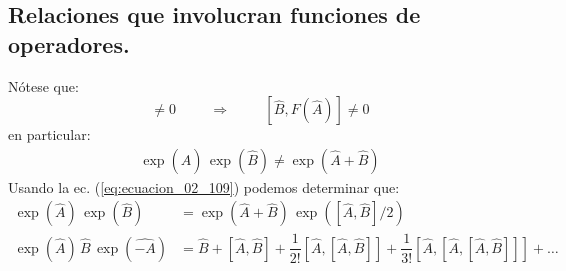 \subsection*{Relaciones que involucran funciones de operadores.}

Nótese que:
\begin{equation}
[\hat{A}, \hat{B}] \neq 0 \hspace{1cm} \Longrightarrow \hspace{1cm} [\hat{B} , F(\hat{A}) ] \neq 0
\label{eq:ecuacion_02_115}
\end{equation}
en particular:
\begin{align*}
\exp(\hat{A}) \, \exp(\hat{B}) \neq \exp(\hat{A} + \hat{B})
\end{align*}
Usando la ec. (\ref{eq:ecuacion_02_109}) podemos determinar que:
\begin{align}
\exp(\hat{A}) \, \exp(\hat{B}) &= \exp(\hat{A} + \hat{B}) \, \exp([\hat{A}, \hat{B}]/2) \label{eq:ecuacion_02_116} \\[1em]
\exp(\hat{A}) \, \hat{B} \, \exp(\hat{-A}) &= \hat{B} + [\hat{A}, \hat{B}] + \dfrac{1}{2!} [\hat{A}, [\hat{A}, \hat{B}]] + \dfrac{1}{3!} [\hat{A}, [ \hat{A}, [\hat{A}, \hat{B}]]] + \ldots \label{eq:ecuacion_02_117}
\end{align}

